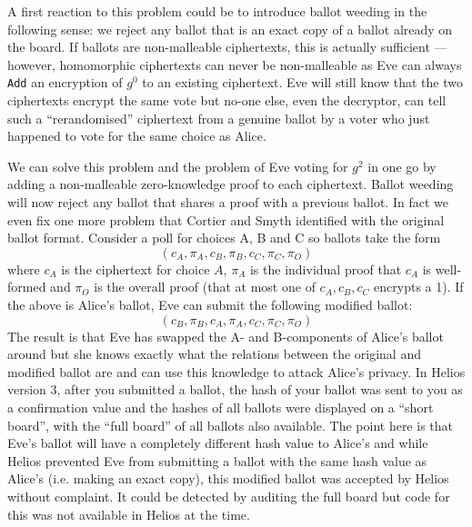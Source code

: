 \documentclass{llncs}
\newcommand{\alg}[1]{\textup{\texttt{#1}}}
\begin{document}
A first reaction to this problem could be to introduce ballot weeding in the
following sense: we reject any ballot that is an exact copy of a ballot already
on the board. If ballots are non-malleable ciphertexts, this is actually
sufficient --- however, homomorphic ciphertexts can never be non-malleable as
Eve can always \alg{Add} an encryption of $g^0$ to an existing ciphertext. Eve
will still know that the two ciphertexts encrypt the same vote but no-one else,
even the decryptor, can tell such a ``rerandomised'' ciphertext from a genuine
ballot by a voter who just happened to vote for the same choice as Alice.

We can solve this problem and the problem of Eve voting for $g^2$ in one go by
adding a non-malleable zero-knowledge proof to each ciphertext. Ballot weeding
will now reject any ballot that shares a proof with a previous ballot. In fact
we even fix one more problem that Cortier and Smyth identified with the original
ballot format. Consider a poll for choices A, B and C so ballots take the form
\[
(c_A, \pi_A, c_B, \pi_B, c_C, \pi_C, \pi_O)
\]
where $c_A$ is the ciphertext for choice $A$, $\pi_A$ is the individual proof
that $c_A$ is well-formed and $\pi_O$ is the overall proof (that at most one
of $c_A, c_B, c_C$ encrypts a 1). If the above is Alice's ballot, Eve can submit
the following modified ballot:
\[
(c_B, \pi_B, c_A, \pi_A, c_C, \pi_C, \pi_O)
\]
The result is that Eve has swapped the A- and B-components of Alice's ballot around but she knows exactly what the relations between the original and
modified ballot are and can use this knowledge to attack Alice's privacy. In
Helios version 3, after you submitted a ballot, the hash of your ballot was
sent to you as a confirmation value and the hashes of all ballots were displayed
on a ``short board'', with the ``full board'' of all ballots also available. The
point here is that Eve's ballot will have a completely different hash value to
Alice's and while Helios prevented Eve from submitting a ballot with the same
hash value as Alice's (i.e. making an exact copy), this modified ballot was
accepted by Helios without complaint. It could be detected by auditing the full
board but code for this was not available in Helios at the time.
\end{document}
